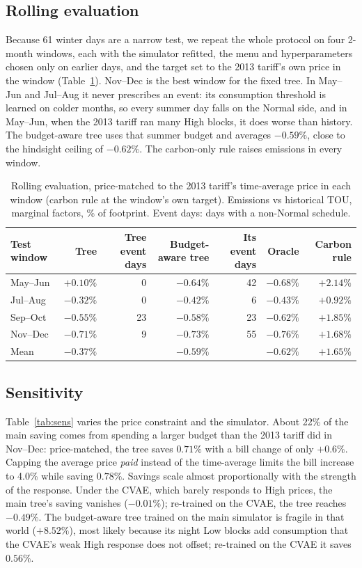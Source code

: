 \documentclass[11pt]{article}
\newcommand{\pct}[1]{$#1\%$}
\begin{document}
\subsection{Rolling evaluation}\label{sec:rolling}
Because 61 winter days are a narrow test, we repeat the whole protocol on four 2-month windows, each with the
simulator refitted, the menu and hyperparameters chosen only on earlier days, and the target set to the 2013 tariff's own
price in the window (Table~\ref{tab:rolling}). Nov--Dec is the best window for the fixed tree. In May--Jun and Jul--Aug
it never prescribes an event: its consumption threshold is learned on colder months, so every summer day falls on the
Normal side, and in May--Jun, when the 2013 tariff ran many High blocks, it does worse than history. The budget-aware
tree uses that summer budget and averages \pct{-0.59}, close to the hindsight ceiling of \pct{-0.62}. The carbon-only
rule raises emissions in every window.

\begin{table}[t]
\centering\small
\caption{Rolling evaluation, price-matched to the 2013 tariff's time-average price in each window (carbon rule at the
window's own target). Emissions vs historical TOU, marginal factors, \% of footprint. Event days: days with a
non-Normal schedule.}
\label{tab:rolling}
\begin{tabular}{lrrrrrr}
\toprule
Test window & Tree & Tree event days & Budget-aware tree & Its event days & Oracle & Carbon rule \\
\midrule
May--Jun & $+0.10\%$ & 0 & $-0.64\%$ & 42 & $-0.68\%$ & $+2.14\%$ \\
Jul--Aug & $-0.32\%$ & 0 & $-0.42\%$ & 6 & $-0.43\%$ & $+0.92\%$ \\
Sep--Oct & $-0.55\%$ & 23 & $-0.58\%$ & 23 & $-0.62\%$ & $+1.85\%$ \\
Nov--Dec & $-0.71\%$ & 9 & $-0.73\%$ & 55 & $-0.76\%$ & $+1.68\%$ \\
\midrule
Mean & $-0.37\%$ & & $-0.59\%$ & & $-0.62\%$ & $+1.65\%$ \\
\bottomrule
\end{tabular}
\end{table}

\subsection{Sensitivity}\label{sec:sens}
Table~\ref{tab:sens} varies the price constraint and the simulator. About 22\% of the main saving comes from spending
a larger budget than the 2013 tariff did in Nov--Dec: price-matched, the tree saves \pct{0.71} with a bill change of
only \pct{+0.6}. Capping the average price \emph{paid} instead of the time-average limits the bill increase to 4.0\%
while saving \pct{0.78}. Savings scale almost proportionally with the strength of the response. Under the CVAE,
which barely responds to High prices, the main tree's saving vanishes (\pct{-0.01}); re-trained on the CVAE, the tree
reaches \pct{-0.49}. The budget-aware tree trained on the main simulator is fragile in that world (\pct{+8.52}),
most likely because its night Low blocks add consumption that the CVAE's weak High response does not offset;
re-trained on the CVAE it saves \pct{0.56}.
\end{document}
